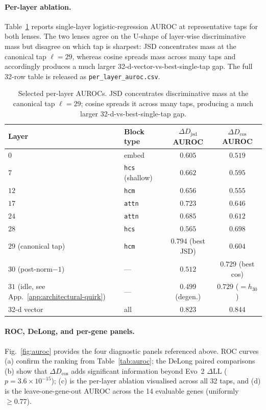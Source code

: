 \documentclass{article}
\theoremstyle{plain}
\theoremstyle{definition}
\theoremstyle{remark}
\newcommand{\DDcos}{\Delta D_{\cos}}
\newcommand{\DDjsd}{\Delta D_{\mathrm{jsd}}}
\begin{document}
\paragraph{Per-layer ablation.} Table~\ref{tab:per-layer} reports
single-layer logistic-regression AUROC at representative taps for both
lenses. The two lenses agree on the U-shape of layer-wise discriminative
mass but disagree on which tap is sharpest: JSD concentrates mass at the
canonical tap $\ell\!=\!29$, whereas cosine spreads mass across many
taps and accordingly produces a much larger 32-d-vector-vs-best-single-tap
gap. The full 32-row table is released as
\texttt{per\_layer\_auroc.csv}.

\begin{table}[!htbp]
\caption{Selected per-layer AUROCs. JSD concentrates discriminative
mass at the canonical tap $\ell\!=\!29$; cosine spreads it across many
taps, producing a much larger 32-d-vs-best-single-tap gap.}
\label{tab:per-layer}
\centering
\small
\begin{tabular}{@{}llcc@{}}
\toprule
Layer & Block type & $\DDjsd$ AUROC & $\DDcos$ AUROC \\
\midrule
$0$  & embed                    & $0.605$ & $0.519$ \\
$7$  & \texttt{hcs} (shallow)   & $0.662$ & $0.595$ \\
$12$ & \texttt{hcm}             & $0.656$ & $0.555$ \\
$17$ & \texttt{attn}            & $0.723$ & $0.646$ \\
$24$ & \texttt{attn}            & $0.685$ & $0.612$ \\
$28$ & \texttt{hcs}             & $0.565$ & $0.698$ \\
$29$ (canonical tap) & \texttt{hcm}
                                & $\mathbf{0.794}$ (best JSD) & $0.604$ \\
$30$ (post-norm$-1$)  & ---     & $0.512$ & $\mathbf{0.729}$ (best cos) \\
$31$ (idle, see App.~\ref{app:architectural-quirk}) & ---
                                & $0.499$ (degen.) & $0.729$ ($=h_{30}$) \\
\midrule
32-d vector & all                 & $0.823$ & $0.844$ \\
\bottomrule
\end{tabular}
\end{table}

\paragraph{ROC, DeLong, and per-gene panels.}
Fig.~\ref{fig:auroc} provides the four diagnostic panels referenced
above. ROC curves (a) confirm the ranking from
Table~\ref{tab:auroc}; the DeLong paired comparisons (b) show that
$\DDcos$ adds significant information beyond Evo~2 $\Delta\textrm{LL}$
($p\!=\!3.6\!\times\!10^{-15}$); (c) is the per-layer ablation visualised
across all 32 taps, and (d) is the leave-one-gene-out AUROC across the
14 evaluable genes (uniformly $\ge 0.77$).
\end{document}
